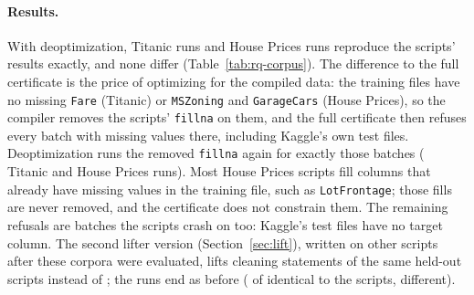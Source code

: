 \paragraph{Results.} With deoptimization, \CorpusSame{} Titanic runs and \HousesSame{} House Prices
runs reproduce the scripts' results exactly, and none differ (Table~\ref{tab:rq-corpus}). The
difference to the full certificate is the price of optimizing for the compiled data: the training
files have no missing \texttt{Fare} (Titanic) or \texttt{MSZoning} and \texttt{GarageCars} (House
Prices), so the compiler removes the scripts' \texttt{fillna} on them, and the full certificate then
refuses every batch with missing values there, including Kaggle's own test files. Deoptimization runs
the removed \texttt{fillna} again for exactly those batches (\CorpusDeopted{} Titanic and
\HousesDeopted{} House Prices runs). Most House Prices scripts fill columns that already have missing
values in the training file, such as \texttt{LotFrontage}; those fills are never removed, and the
certificate does not constrain them. The remaining refusals are batches the scripts crash on too:
Kaggle's test files have no target column. The second lifter version (Section~\ref{sec:lift}), written
on other scripts after these corpora were evaluated, lifts \CorpusBothDerStatements{} cleaning
statements of the same held-out scripts instead of \CorpusBothStatements{}; the runs end as before
(\CorpusBothDerSame{} of \CorpusBothDerRuns{} identical to the scripts, \CorpusBothDerUnsound{}
different).



